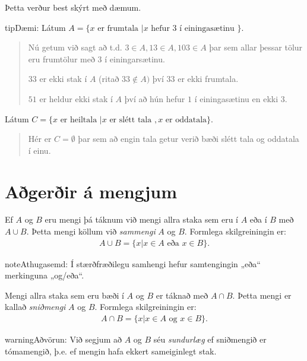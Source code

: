 \documentclass[a4paper,10pt,icelandic]{sphinxmanual}
\begin{document}
Þetta verður best skýrt með dæmum.

\begin{sphinxadmonition}{tip}{Dæmi:}
 Látum \(A = \{x \text{ er frumtala }| x \text{ hefur } 3 \text{ í einingasætinu }\}\).
\begin{quote}

Nú getum við sagt að t.d. \(3 \in A, 13 \in A, 103 \in A\) þar sem allar þessar tölur eru frumtölur með \(3\) í einingarsætinu.

\(33\) er ekki stak í \(A\) (ritað \(33 \notin A)\) því \(33\) er ekki frumtala.

\(51\) er heldur ekki stak í \(A\) því að hún hefur \(1\) í einingasætinu en ekki \(3\).
\end{quote}

 Látum \(C = \{x \text{ er heiltala }| x \text{ er slétt tala }, x \text{ er oddatala}\}\).
\begin{quote}

Hér er \(C = \emptyset\) þar sem að engin tala getur verið bæði slétt tala og oddatala í einu.
\end{quote}
\end{sphinxadmonition}


\section{Aðgerðir á mengjum}
\label{\detokenize{Kafli04:agerir-a-mengjum}}
Ef \(A\) og \(B\) eru mengi þá táknum við mengi allra staka sem eru í \(A\) eða í \(B\) með
\(A\cup B\). Þetta mengi köllum við \textit{sammengi} \(A\) og \(B\).
Formlega skilgreiningin er:
\begin{equation*}
\begin{split}A\cup B = \{x| x \in A \text{ eða } x \in B\}.\end{split}
\end{equation*}
\begin{sphinxadmonition}{note}{Athugasemd:}
Í stærðfræðilegu samhengi hefur samtengingin „eða“ merkinguna „og/eða“.
\end{sphinxadmonition}

Mengi allra staka sem eru bæði í \(A\) og \(B\) er táknað með \(A \cap B\). Þetta mengi er kallað
\textit{sniðmengi} \(A\) og \(B\).
Formlega skilgreiningin er:
\begin{equation*}
\begin{split}A\cap B = \{x| x \in A \text{ og } x \in B\}.\end{split}
\end{equation*}
\begin{sphinxadmonition}{warning}{Aðvörun:}
Við segjum að \(A\) og \(B\) séu \textit{sundurlæg} ef sniðmengið er tómamengið, þ.e. ef mengin hafa ekkert sameiginlegt stak.
\end{sphinxadmonition}
\end{document}
